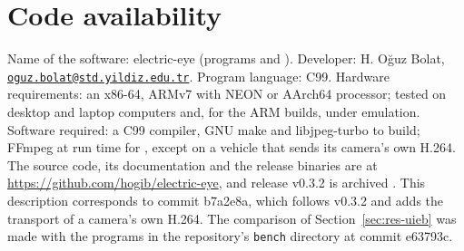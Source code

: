\section*{Code availability}

Name of the software: electric-eye (programs \eeye{} and \hellion{}). Developer:
H. O\u{g}uz Bolat,
\href{mailto:oguz.bolat@std.yildiz.edu.tr}{\nolinkurl{oguz.bolat@std.yildiz.edu.tr}}.
Program language: C99. Hardware requirements: an x86-64, ARMv7 with
NEON or AArch64 processor;
tested on desktop and laptop computers and, for the ARM builds, under emulation.
Software required: a C99 compiler, GNU make and libjpeg-turbo to
build; FFmpeg at run
time for \hellion{}, except on a vehicle that sends its camera's own
H.264. The source code, its documentation and the release binaries are at
\url{https://github.com/hogib/electric-eye}, and release v0.3.2 is archived
\cite{electriceye}. This description corresponds to commit b7a2e8a,
which follows
v0.3.2 and adds the transport of a camera's own H.264. The comparison of
Section~\ref{sec:res-uieb} was made with the programs in the repository's
\texttt{bench} directory at commit e63793c.
